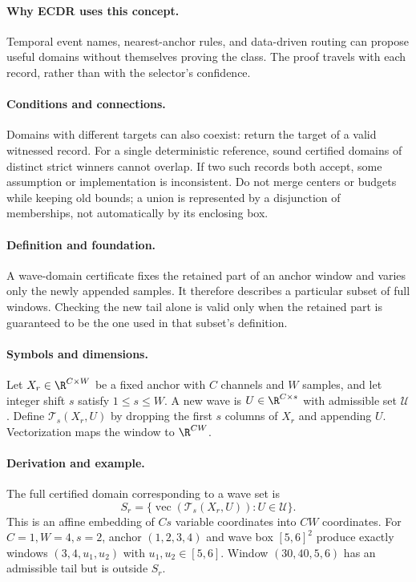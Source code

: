 \paragraph{Why ECDR uses this concept.}
Temporal event names, nearest-anchor rules, and data-driven routing can propose useful domains without themselves proving the class. The proof travels with each record, rather than with the selector's confidence.
\paragraph{Conditions and connections.}
Domains with different targets can also coexist: return the target of a valid witnessed record. For a single deterministic reference, sound certified domains of distinct strict winners cannot overlap. If two such records both accept, some assumption or implementation is inconsistent. Do not merge centers or budgets while keeping old bounds; a union is represented by a disjunction of memberships, not automatically by its enclosing box.

\paragraph{Definition and foundation.}
A wave-domain certificate fixes the retained part of an anchor window and varies only the newly appended samples. It therefore describes a particular subset of full windows. Checking the new tail alone is valid only when the retained part is guaranteed to be the one used in that subset's definition.
\paragraph{Symbols and dimensions.}
Let $X_r\in\R^{C\times W}$ be a fixed anchor with $C$ channels and $W$ samples, and let integer shift $s$ satisfy $1\le s\le W$. A new wave is $U\in\R^{C\times s}$ with admissible set $\mathcal U$. Define $\mathcal T_s(X_r,U)$ by dropping the first $s$ columns of $X_r$ and appending $U$. Vectorization maps the window to $\R^{CW}$.
\paragraph{Derivation and example.}
The full certified domain corresponding to a wave set is
\[
 S_r=\{\operatorname{vec}(\mathcal T_s(X_r,U)):U\in\mathcal U\}.
\]
This is an affine embedding of $Cs$ variable coordinates into $CW$ coordinates. For $C=1,W=4,s=2$, anchor $(1,2,3,4)$ and wave box $[5,6]^2$ produce exactly windows $(3,4,u_1,u_2)$ with $u_1,u_2\in[5,6]$. Window $(30,40,5,6)$ has an admissible tail but is outside $S_r$.
